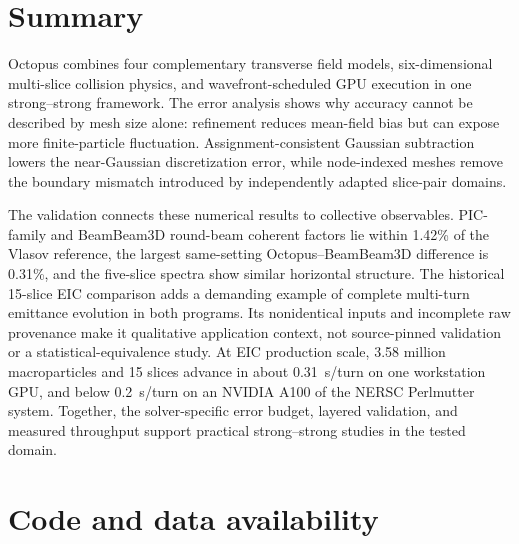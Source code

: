 \documentclass[a4paper,fleqn]{cas-sc}
\begin{document}
\section{Summary}
\label{sec:summary}

Octopus combines four complementary transverse field models,
six-dimensional multi-slice collision physics, and wavefront-scheduled GPU
execution in one
strong--strong framework.  The error analysis shows why accuracy cannot be
described by mesh size alone: refinement reduces mean-field bias but can expose
more finite-particle fluctuation.  Assignment-consistent Gaussian subtraction
lowers the near-Gaussian discretization error, while node-indexed meshes remove
the boundary mismatch introduced by independently adapted slice-pair domains.

The validation connects these numerical results to collective observables.
PIC-family and BeamBeam3D round-beam coherent factors lie within 1.42\% of the
Vlasov reference, the largest same-setting Octopus--BeamBeam3D difference is
0.31\%, and the
five-slice spectra show similar horizontal structure.  The historical
15-slice EIC comparison adds a demanding example of complete multi-turn
emittance evolution in both programs.  Its nonidentical inputs and incomplete
raw provenance make it qualitative application context, not source-pinned
validation or a statistical-equivalence study.  At EIC production scale, 3.58 million
macroparticles and 15 slices advance in about 0.31~s/turn on one workstation
GPU, and below 0.2~s/turn on an NVIDIA A100 of the NERSC Perlmutter
system.  Together, the solver-specific error budget, layered validation, and
measured throughput support practical strong--strong studies in the tested
domain.

\section*{Code and data availability}
\end{document}
